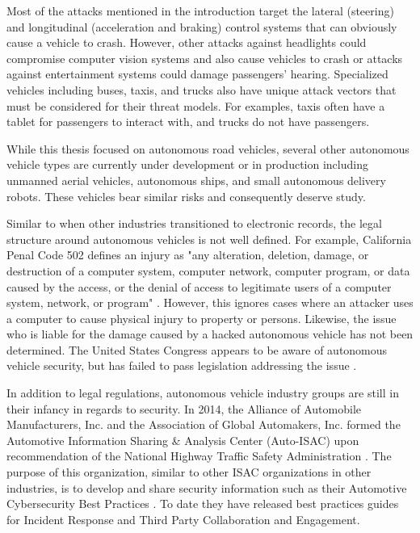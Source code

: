 \documentclass{article}
\begin{document}
\noindent Most of the attacks mentioned in the introduction target the lateral (steering) and longitudinal (acceleration and braking) control systems that can obviously cause a vehicle to crash. However, other attacks against headlights could compromise computer vision systems and also cause vehicles to crash or attacks against entertainment systems could damage passengers' hearing. Specialized vehicles including buses, taxis, and trucks also have unique attack vectors that must be considered for their threat models. For examples, taxis often have a tablet for passengers to interact with, and trucks do not have passengers.

While this thesis focused on autonomous road vehicles, several other autonomous vehicle types are currently under development or in production including unmanned aerial vehicles, autonomous ships, and small autonomous delivery robots. These vehicles bear similar risks and consequently deserve study.

Similar to when other industries transitioned to electronic records, the legal structure around autonomous vehicles is not well defined. For example, California Penal Code 502 defines an injury as "any alteration, deletion, damage, or destruction of a computer system, computer network, computer program, or data caused by the access, or the denial of access to legitimate users of a computer system, network, or program" \citep{waldron_california_2015}. However, this ignores cases where an attacker uses a computer to cause physical injury to property or persons. Likewise, the issue who is liable for the damage caused by a hacked autonomous vehicle has not been determined. The United States Congress appears to be aware of autonomous vehicle security, but has failed to pass legislation addressing the issue \citep{latta_self_2017, thune_av_2017}.

In addition to legal regulations, autonomous vehicle industry groups are still in their infancy in regards to security. In 2014, the Alliance of Automobile Manufacturers, Inc. and the Association of Global Automakers, Inc. formed the Automotive Information Sharing \& Analysis Center (Auto-ISAC) upon recommendation of the National Highway Traffic Safety Administration \citep{bainwol_letter_2014, beuse_docket_2014}. The purpose of this organization, similar to other ISAC organizations in other industries, is to develop and share security information such as their Automotive Cybersecurity Best Practices \citep{automotive_information_sharing_and_analysis_center_auto-isac_automotive_}. To date they have released best practices guides for Incident Response and Third Party Collaboration and Engagement.
\end{document}

